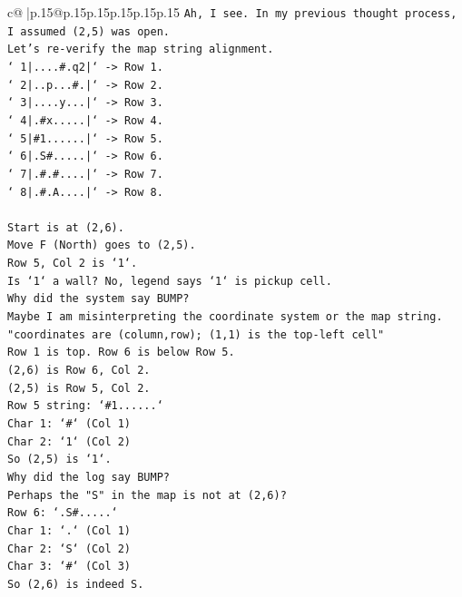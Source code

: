 \documentclass{article}
\begin{document}
{\begin{supertabular}{c@{$\;$}|p{.15\linewidth}@{}p{.15\linewidth}p{.15\linewidth}p{.15\linewidth}p{.15\linewidth}p{.15\linewidth}}
{{{\texttt{Ah, I see. In my previous thought process, I assumed (2,5) was open.} \\
\texttt{Let's re{-}verify the map string alignment.} \\
\texttt{` 1|....\#.q2|` {-}> Row 1.} \\
\texttt{` 2|..p...\#.|` {-}> Row 2.} \\
\texttt{` 3|....y...|` {-}> Row 3.} \\
\texttt{` 4|.\#x.....|` {-}> Row 4.} \\
\texttt{` 5|\#1......|` {-}> Row 5.} \\
\texttt{` 6|.S\#.....|` {-}> Row 6.} \\
\texttt{` 7|.\#.\#....|` {-}> Row 7.} \\
\texttt{` 8|.\#.A....|` {-}> Row 8.} \\
\\ 
\texttt{Start is at (2,6).} \\
\texttt{Move F (North) goes to (2,5).} \\
\texttt{Row 5, Col 2 is `1`.} \\
\texttt{Is `1` a wall? No, legend says `1` is pickup cell.} \\
\texttt{Why did the system say BUMP?} \\
\texttt{Maybe I am misinterpreting the coordinate system or the map string.} \\
\texttt{"coordinates are (column,row); (1,1) is the top{-}left cell"} \\
\texttt{Row 1 is top. Row 6 is below Row 5.} \\
\texttt{(2,6) is Row 6, Col 2.} \\
\texttt{(2,5) is Row 5, Col 2.} \\
\texttt{Row 5 string: `\#1......`} \\
\texttt{Char 1: `\#` (Col 1)} \\
\texttt{Char 2: `1` (Col 2)} \\
\texttt{So (2,5) is `1`.} \\
\texttt{Why did the log say BUMP?} \\
\texttt{Perhaps the "S" in the map is not at (2,6)?} \\
\texttt{Row 6: `.S\#.....`} \\
\texttt{Char 1: `.` (Col 1)} \\
\texttt{Char 2: `S` (Col 2)} \\
\texttt{Char 3: `\#` (Col 3)} \\
\texttt{So (2,6) is indeed S.} \\
}}}
\end{supertabular}}
\end{document}
